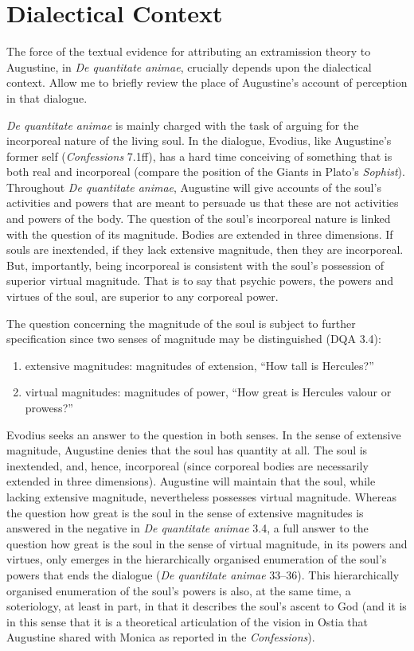 \documentclass[12pt]{article}
\begin{document}

\section{Dialectical Context} %
\label{sec:dialectical_context}

The force of the textual evidence for attributing an extramission theory to Augustine, in \emph{De quantitate animae}, crucially depends upon the dialectical context. Allow me to briefly review the place of Augustine's account of perception in that dialogue.

\emph{De quantitate animae}  is mainly charged with the task of arguing for the incorporeal nature of the living soul. In the dialogue, Evodius, like Augustine’s former self (\emph{Confessions} 7.1ff), has a hard time conceiving of something that is both real and incorporeal (compare the position of the Giants in Plato's \emph{Sophist}). Throughout \emph{De quantitate animae}, Augustine will give accounts of the soul’s activities and powers that are meant to persuade us that these are not activities and powers of the body. The question of the soul’s incorporeal nature is linked with the question of its magnitude. Bodies are extended in three dimensions. If souls are inextended, if they lack extensive magnitude, then they are incorporeal. But, importantly, being incorporeal is consistent with the soul’s possession of superior virtual magnitude. That is to say that psychic powers, the powers and virtues of the soul, are superior to any corporeal power. 

The question concerning the magnitude of the soul is subject to further specification since two senses of magnitude may be distinguished (DQA 3.4):
\begin{enumerate}
	\item extensive magnitudes: magnitudes of extension, “How tall is Hercules?”
	\item virtual magnitudes: magnitudes of power, “How great is Hercules valour or prowess?”
\end{enumerate}
Evodius seeks an answer to the question in both senses. In the sense of extensive magnitude, Augustine denies that the soul has quantity at all. The soul is inextended, and, hence, incorporeal (since corporeal bodies are necessarily extended in three dimensions). Augustine will maintain that the soul, while lacking extensive magnitude, nevertheless possesses virtual magnitude. Whereas the question how great is the soul in the sense of extensive magnitudes is answered in the negative in \emph{De quantitate animae} 3.4, a full answer to the question how great is the soul in the sense of virtual magnitude, in its powers and virtues, only emerges in the hierarchically organised enumeration of the soul’s powers that ends the dialogue (\emph{De quantitate animae} 33–36). This hierarchically organised enumeration of the soul’s powers is also, at the same time, a soteriology, at least in part, in that it describes the soul’s ascent to God (and it is in this sense that it is a theoretical articulation of the vision in Ostia that Augustine shared with Monica as reported in the \emph{Confessions}).
\end{document}
